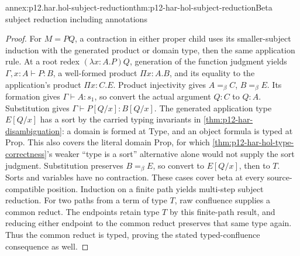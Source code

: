 \begin{annexitem}{annex:p12.har.hol-subject-reduction}{thm:p12-har-hol-subject-reduction}{Beta subject reduction including annotations}
\begin{proof}
For \(M=PQ\), a contraction in either proper child uses its
smaller-subject induction with the generated product or domain type,
then the same application rule. At a root redex
\((\lambda x:A.P)Q\), generation of the function judgment yields
\(\Gamma,x:A\vdash P:B\), a well-formed product
\(\Pi x:A.B\), and its equality to the application's product
\(\Pi x:C.E\). Product injectivity gives \(A=_\beta C\),
\(B=_\beta E\). Its formation gives \(\Gamma\vdash A:s_1\),
so convert the actual argument \(Q:C\) to \(Q:A\). Substitution
gives \(\Gamma\vdash P[Q/x]:B[Q/x]\). The generated application
type \(E[Q/x]\) has a sort by the carried typing invariants in \cref{thm:p12-har-disambiguation}:
a domain is formed at Type, and an object formula is typed at Prop.
This also covers the literal domain Prop, for which \cref{thm:p12-har-hol-type-correctness}'s weaker
``type is a sort'' alternative alone would not supply the sort judgment.
Substitution preserves \(B=_\beta E\), so convert to
\(E[Q/x]\), then to \(T\). Sorts and variables have no contraction.
These cases cover beta at every source-compatible position.
Induction on a finite path yields multi-step subject reduction.
For two paths from a term of type \(T\), raw confluence supplies a
common reduct. The endpoints retain type \(T\) by this finite-path
result, and reducing either endpoint to the common reduct preserves that
same type again. Thus the common reduct is typed, proving the stated
typed-confluence consequence as well.
\end{proof}
\end{annexitem}

